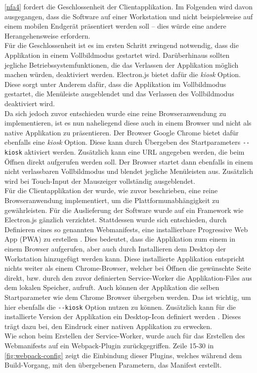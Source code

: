 \ref{nfa4} fordert die Geschlossenheit der Clientapplikation. Im Folgenden wird davon ausgegangen, 
dass die Software auf einer Workstation und nicht beispielsweise auf einem mobilen Endgerät präsentiert
werden soll -- dies würde eine andere Herangehensweise erfordern.\\
Für die Geschlossenheit ist es im ersten Schritt zwingend notwendig, dass die Applikation in einem 
Vollbildmodus gestartet wird. Darüberhinaus sollten jegliche Betriebssystemfunktionen, die das 
Verlassen der Applikation möglich machen würden, deaktiviert werden. Electron.js bietet dafür
die \emph{kiosk} Option. Diese sorgt unter Anderem dafür, dass die Applikation im Vollbildmodus gestartet, 
die Menüleiste ausgeblendet und das Verlassen des Vollbildmodus deaktiviert wird.\\
Da sich jedoch zuvor entschieden wurde eine reine Browseranwendung zu implementieren, ist es nun naheliegend 
diese auch in einem Browser und nicht als native Applikation zu präsentieren. Der Browser Google Chrome bietet
dafür ebenfalls eine \emph{kiosk} Option. Diese kann durch Übergeben des Startparameters \texttt{-{}-kiosk}
aktiviert werden. Zusätzlich kann eine URL angegeben werden, die beim Öffnen direkt aufgerufen werden soll.
Der Browser startet dann ebenfalls in einem nicht verlassbaren Vollbildmodus und blendet jegliche Menüleisten aus.
Zusätzlich wird bei Touch-Input der Mauszeiger vollständig ausgeblendet.\\

Für die Clientapplikation der \shst{} wurde, wie zuvor beschrieben, eine reine Browseranwendung implementiert,
um die Plattformunabhängigkeit zu gewährleisten. Für die Auslieferung der Software wurde auf ein Framework wie
Electron.js gänzlich verzichtet. Stattdessen wurde sich entschieden, durch Definieren eines so genannten Webmanifests,
eine installierbare Progressive Web App (PWA) zu erstellen \cite{web-app-manifest}. Dies bedeutet, 
dass die Applikation zum einem in einem Browser aufgerufen, aber auch durch Installieren dem Desktop 
der Workstation hinzugefügt werden kann. Diese installierte Applikation entspricht nichts 
weiter als einem Chrome-Browser, welcher bei Öffnen die gewünschte Seite direkt,
bzw. durch den zuvor definierten Service-Worker die Applikation-Files aus dem lokalen Speicher, aufruft. Auch
können der Applikation die selben Startparameter wie dem Chrome Browser übergeben werden. Das ist wichtig,
um hier ebenfalls die \texttt{-{}-kiosk} Option nutzen zu können.
Zusätzlich kann für die installierte Version der Applikation ein Desktop-Icon definiert werden \cite{web-app-manifest}.
Dieses trägt dazu bei, den Eindruck einer nativen Applikation zu erwecken.\\
Wie schon beim Erstellen der Service-Worker, wurde auch für das Erstellen des Webmanifests auf ein 
Webpack-Plugin \cite{webpack-pwa-manifest-plugin} zurückgegriffen. Zeile 15-30 in \autoref{fig:webpack-config} 
zeigt die Einbindung dieser Plugins, welches während dem Build-Vorgang, mit den übergebenen Parametern, das Manifest erstellt. 

